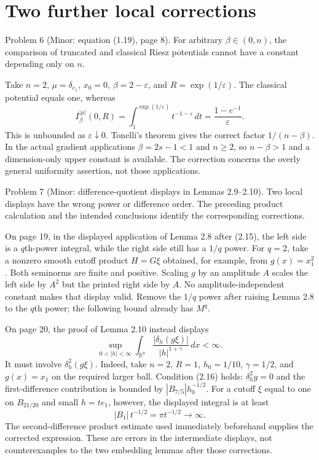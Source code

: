 \documentclass[10pt]{article}
\begin{document}
\section*{Two further local corrections}
Problem 6 (Minor: equation (1.19), page 8).  For arbitrary \(\beta\in(0,n)\), the comparison of truncated and classical Riesz potentials cannot have a constant depending only on \(n\).\par
Take \(n=2\), \(\mu=\delta_{e_1}\), \(x_0=0\), \(\beta=2-\varepsilon\), and \(R=\exp(1/\varepsilon)\). The classical potential equals one, whereas \[I_\beta^{|\mu|}(0,R)=
 \int_1^{\exp(1/\varepsilon)}t^{-1-\varepsilon}\,dt
 =\frac{1-e^{-1}}{\varepsilon}.\] This is unbounded as \(\varepsilon\downarrow0\). Tonelli’s theorem gives the correct factor \(1/(n-\beta)\). In the actual gradient applications \(\beta=2s-1<1\) and \(n\geq2\), so \(n-\beta>1\) and a dimension-only upper constant is available. The correction concerns the overly general uniformity assertion, not those applications.\par
Problem 7 (Minor: difference-quotient displays in Lemmas 2.9–2.10).  Two local displays have the wrong power or difference order. The preceding product calculation and the intended conclusions identify the corresponding corrections.\par
On page 19, in the displayed application of Lemma 2.8 after (2.15), the left side is a \(q\)th-power integral, while the right side still has a \(1/q\) power. For \(q=2\), take a nonzero smooth cutoff product \(H=G\xi\) obtained, for example, from \(g(x)=x_1^2\). Both seminorms are finite and positive. Scaling \(g\) by an amplitude \(A\) scales the left side by \(A^2\) but the printed right side by \(A\). No amplitude-independent constant makes that display valid. Remove the \(1/q\) power after raising Lemma 2.8 to the \(q\)th power; the following bound already has \(M^q\).\par
On page 20, the proof of Lemma 2.10 instead displays \[\sup_{0<|h|<\infty}
       \int_{\mathbb R^n}\frac{|\delta_h(g\xi)|}{|h|^{1+\gamma}}\,dx
       <\infty.\] It must involve \(\delta_h^2(g\xi)\). Indeed, take \(n=2\), \(R=1\), \(h_0=1/10\), \(\gamma=1/2\), and \(g(x)=x_1\) on the required larger ball. Condition (2.16) holds: \(\delta_h^2g=0\) and the first-difference contribution is bounded by \(|B_{7/5}|h_0^{-1/2}\). For a cutoff \(\xi\) equal to one on \(B_{21/20}\) and small \(h=te_1\), however, the displayed integral is at least \[|B_1|\,t^{-1/2}=\pi t^{-1/2}\longrightarrow\infty.\] The second-difference product estimate used immediately beforehand supplies the corrected expression. These are errors in the intermediate displays, not counterexamples to the two embedding lemmas after those corrections.\par
\end{document}
